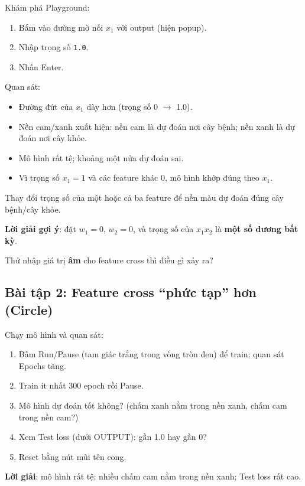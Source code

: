 \documentclass[12pt,a4paper]{article}
\begin{document}
\begin{phuongphap}[title={Task 1}]
Khám phá Playground:
\begin{enumerate}
  \item Bấm vào đường mờ nối \(x_1\) với output (hiện popup).
  \item Nhập trọng số \texttt{1.0}.
  \item Nhấn Enter.
\end{enumerate}
Quan sát:
\begin{itemize}
  \item Đường đứt của \(x_1\) dày hơn (trọng số 0 \(\to\) 1.0).
  \item Nền cam/xanh xuất hiện: nền cam là dự đoán nơi cây bệnh; nền xanh là dự đoán nơi cây khỏe.
  \item Mô hình rất tệ; khoảng một nửa dự đoán sai.
  \item Vì trọng số \(x_1=1\) và các feature khác 0, mô hình khớp đúng theo \(x_1\).
\end{itemize}
\end{phuongphap}

\begin{phuongphap}[title={Task 2}]
Thay đổi trọng số của một hoặc cả ba feature để nền màu dự đoán đúng cây bệnh/cây khỏe.

\textbf{Lời giải gợi ý}: đặt \(w_1=0\), \(w_2=0\), và trọng số của \(x_1x_2\) là \textbf{một số dương bất kỳ}.
\end{phuongphap}

\begin{luuy}
Thử nhập giá trị \textbf{âm} cho feature cross thì điều gì xảy ra?
\end{luuy}

\subsection{Bài tập 2: Feature cross ``phức tạp'' hơn (Circle)}

\begin{phuongphap}[title={Task 1}]
Chạy mô hình và quan sát:
\begin{enumerate}
  \item Bấm Run/Pause (tam giác trắng trong vòng tròn đen) để train; quan sát Epochs tăng.
  \item Train ít nhất 300 epoch rồi Pause.
  \item Mô hình dự đoán tốt không? (chấm xanh nằm trong nền xanh, chấm cam trong nền cam?)
  \item Xem Test loss (dưới OUTPUT): gần 1.0 hay gần 0?
  \item Reset bằng nút mũi tên cong.
\end{enumerate}
\textbf{Lời giải}: mô hình rất tệ; nhiều chấm cam nằm trong nền xanh; Test loss rất cao.
\end{phuongphap}
\end{document}
